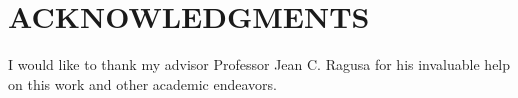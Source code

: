 \chapter*{ACKNOWLEDGMENTS}
I would like to thank my advisor Professor Jean C. Ragusa for his invaluable help on this work and other academic endeavors. 



\pagebreak{}
